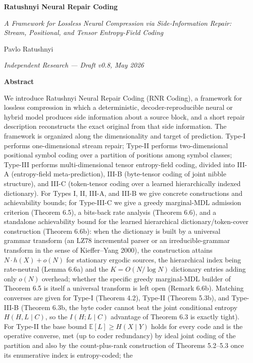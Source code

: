 \documentclass[
]{article}
\author{}
\date{}
\begin{document}
\textbf{Ratushnyi Neural Repair Coding}

\emph{A Framework for Lossless Neural Compression via Side‑Information
Repair: Stream, Positional, and Tensor Entropy‑Field Coding}

Pavlo Ratushnyi

\emph{Independent Research --- Draft v0.8, May 2026}

\textbf{Abstract}

We introduce Ratushnyi Neural Repair Coding (RNR Coding), a framework
for lossless compression in which a deterministic,
decoder-reproducible neural or hybrid model produces side information
about a source block, and a short repair description reconstructs the
exact original from that side information. The framework is organized
along the dimensionality and target of prediction. Type-I performs
one-dimensional stream repair; Type-II performs two-dimensional
positional symbol coding over a partition of positions among symbol
classes; Type-III performs multi-dimensional tensor entropy-field
coding, divided into III-A (entropy-field meta-prediction), III-B
(byte-tensor coding of joint nibble structure), and III-C
(token-tensor coding over a learned hierarchically indexed
dictionary). For Types I, II, III-A, and III-B we give concrete
constructions and achievability bounds; for Type-III-C we give a
greedy marginal-MDL admission criterion (Theorem 6.5), a
bits-back rate analysis (Theorem 6.6), and a standalone
achievability bound for the learned hierarchical
dictionary/token-cover construction (Theorem 6.6b): when the
dictionary is built by a universal grammar transform (an LZ78
incremental parser or an irreducible-grammar transform in the sense of
Kieffer--Yang 2000), the construction attains $N \cdot h(X) + o(N)$ for
stationary ergodic sources, the hierarchical index being rate-neutral
(Lemma 6.6a) and the $K = O(N/\log N)$ dictionary entries adding only
$o(N)$ overhead; whether the specific greedy marginal-MDL builder of
Theorem 6.5 is itself a universal transform is left open (Remark 6.6b).
Matching converses are given for Type-I (Theorem 4.2), Type-II
(Theorem 5.3b), and Type-III-B (Theorem 6.3b, the byte coder cannot beat
the joint conditional entropy $H(H,L\mid C)$, so the $I(H;L\mid C)$
advantage of Theorem 6.3 is exactly tight). For Type-II the base bound
$\mathbb{E}[L] \geq H(X \mid Y)$ holds for every code and is the operative
converse, met (up to coder redundancy) by ideal joint coding of the
partition and also by the count-plus-rank construction of
Theorems 5.2--5.3 once its enumerative index is entropy-coded; the
\end{document}
